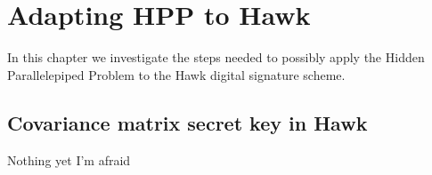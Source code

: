 \chapter{Adapting HPP to Hawk}
In this chapter we investigate the steps needed to possibly apply the Hidden Parallelepiped Problem to the Hawk digital signature scheme.
\section{Covariance matrix secret key in Hawk}
Nothing yet I'm afraid
